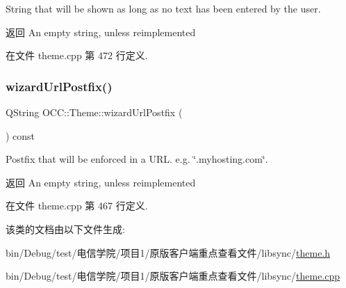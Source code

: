 String that will be shown as long as no text has been entered by the user. 

\begin{DoxyReturn}{返回}
An empty string, unless reimplemented 
\end{DoxyReturn}


在文件 theme.\+cpp 第 472 行定义.

\mbox{\label{class_o_c_c_1_1_theme_a548a11901b16b99f33b22d3d4ee44868}} 
\subsubsection{\texorpdfstring{wizard\+Url\+Postfix()}{wizardUrlPostfix()}}
{\footnotesize\ttfamily Q\+String O\+C\+C\+::\+Theme\+::wizard\+Url\+Postfix (\begin{DoxyParamCaption}{ }\end{DoxyParamCaption}) const\hspace{0.3cm}{\ttfamily [virtual]}}



Postfix that will be enforced in a U\+RL. e.\+g. \char`\"{}.\+myhosting.\+com\char`\"{}. 

\begin{DoxyReturn}{返回}
An empty string, unless reimplemented 
\end{DoxyReturn}


在文件 theme.\+cpp 第 467 行定义.



该类的文档由以下文件生成\+:\begin{DoxyCompactItemize}
\item 
bin/\+Debug/test/电信学院/项目1/原版客户端重点查看文件/libsync/\hyperlink{theme_8h}{theme.\+h}\item 
bin/\+Debug/test/电信学院/项目1/原版客户端重点查看文件/libsync/\hyperlink{theme_8cpp}{theme.\+cpp}\end{DoxyCompactItemize}
